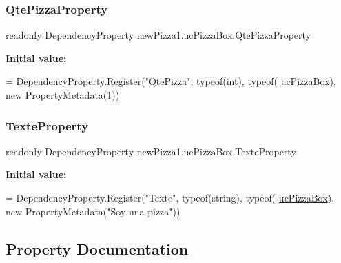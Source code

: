 \subsubsection{\texorpdfstring{Qte\+Pizza\+Property}{QtePizzaProperty}}
{\footnotesize\ttfamily readonly Dependency\+Property new\+Pizza1.\+uc\+Pizza\+Box.\+Qte\+Pizza\+Property\hspace{0.3cm}{\ttfamily [static]}}

{\bfseries Initial value\+:}
\begin{DoxyCode}
=
            DependencyProperty.Register(\textcolor{stringliteral}{"QtePizza"}, typeof(\textcolor{keywordtype}{int}), typeof(
      \hyperlink{classnewPizza1_1_1ucPizzaBox_a2065c5b42e15eb08893bfe6f4c234234}{ucPizzaBox}), \textcolor{keyword}{new} PropertyMetadata(1))
\end{DoxyCode}
\mbox{\label{classnewPizza1_1_1ucPizzaBox_aa7fb40f23691738f213d713a9779a2a7}} 
\subsubsection{\texorpdfstring{Texte\+Property}{TexteProperty}}
{\footnotesize\ttfamily readonly Dependency\+Property new\+Pizza1.\+uc\+Pizza\+Box.\+Texte\+Property\hspace{0.3cm}{\ttfamily [static]}}

{\bfseries Initial value\+:}
\begin{DoxyCode}
=
            DependencyProperty.Register(\textcolor{stringliteral}{"Texte"}, typeof(\textcolor{keywordtype}{string}), typeof(
      \hyperlink{classnewPizza1_1_1ucPizzaBox_a2065c5b42e15eb08893bfe6f4c234234}{ucPizzaBox}), \textcolor{keyword}{new} PropertyMetadata(\textcolor{stringliteral}{"Soy una pizza"}))
\end{DoxyCode}


\subsection{Property Documentation}
\mbox{\label{classnewPizza1_1_1ucPizzaBox_a40fd226307aed4e7d0bf696213f81488}} 
